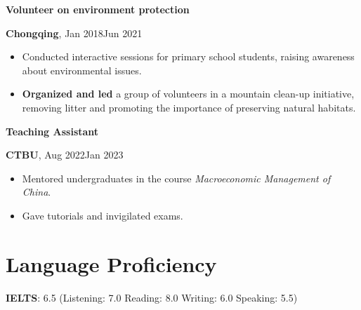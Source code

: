 \documentclass[a4paper,20pt]{article}
\begin{document}
\begin{minipage}{.4\linewidth} \begin{flushleft}
\textbf{Volunteer on environment protection}
    \end{flushleft} \end{minipage}
    \hfill
    \begin{minipage}{.5\linewidth}\begin{flushright}
    	\textbf{Chongqing}, Jan 2018\textemdash Jun 2021
    \end{flushright}\end{minipage}
    \begin{itemize}
    \centering
    \justifying
	\item{Conducted interactive sessions for primary school students, raising awareness about environmental issues.}
    \vspace{-5pt}
   	\item{\textbf{Organized and led} a group of volunteers in a mountain clean-up initiative, removing litter and promoting the importance of preserving natural habitats.}
    \end{itemize}


\begin{minipage}{.4\linewidth} \begin{flushleft}
\textbf{Teaching Assistant}
    \end{flushleft} \end{minipage}
    \hfill
    \begin{minipage}{.5\linewidth}\begin{flushright}
    	\textbf{CTBU}, Aug 2022\textemdash Jan 2023
    \end{flushright}\end{minipage}
    \begin{itemize}
    \centering
    \justifying
	\item{Mentored undergraduates in the course \textit{Macroeconomic Management of China}.}
    \vspace{-5pt}
   	\item{Gave tutorials and invigilated exams.}
    \end{itemize}



\section{Language Proficiency}
\textbf{IELTS}: 6.5 (Listening: 7.0 Reading: 8.0 Writing: 6.0 Speaking: 5.5) \\
\end{document}

